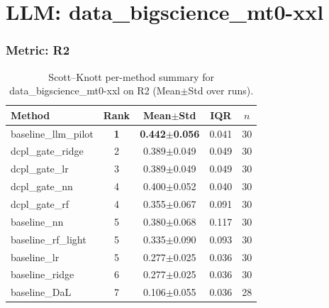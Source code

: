 \section*{LLM: data\_bigscience\_mt0-xxl}

\subsubsection*{Metric: R2}
\begin{table}[H]
\centering
\scriptsize
\setlength{\tabcolsep}{4pt}
\renewcommand{\arraystretch}{1.1}
\caption{Scott--Knott per-method summary for data\_bigscience\_mt0-xxl on R2 (Mean$\pm$Std over runs).}
\label{tab:sk_data_bigscience_mt0-xxl_R2}
\begin{tabular}{l|c|c|c|c}
\hline
\textbf{Method} & \textbf{Rank} & \textbf{Mean$\pm$Std} & \textbf{IQR} & \textbf{$n$} \\
\hline
\rowcolor{red!15} baseline\_llm\_pilot & \textbf{1} & \textbf{0.442$\pm$0.056} & 0.041 & 30 \\
dcpl\_gate\_ridge & 2 & 0.389$\pm$0.049 & 0.049 & 30 \\
dcpl\_gate\_lr & 3 & 0.389$\pm$0.049 & 0.049 & 30 \\
dcpl\_gate\_nn & 4 & 0.400$\pm$0.052 & 0.040 & 30 \\
dcpl\_gate\_rf & 4 & 0.355$\pm$0.067 & 0.091 & 30 \\
baseline\_nn & 5 & 0.380$\pm$0.068 & 0.117 & 30 \\
baseline\_rf\_light & 5 & 0.335$\pm$0.090 & 0.093 & 30 \\
baseline\_lr & 5 & 0.277$\pm$0.025 & 0.036 & 30 \\
baseline\_ridge & 6 & 0.277$\pm$0.025 & 0.036 & 30 \\
baseline\_DaL & 7 & 0.106$\pm$0.055 & 0.036 & 28 \\
\hline
\end{tabular}
\end{table}

